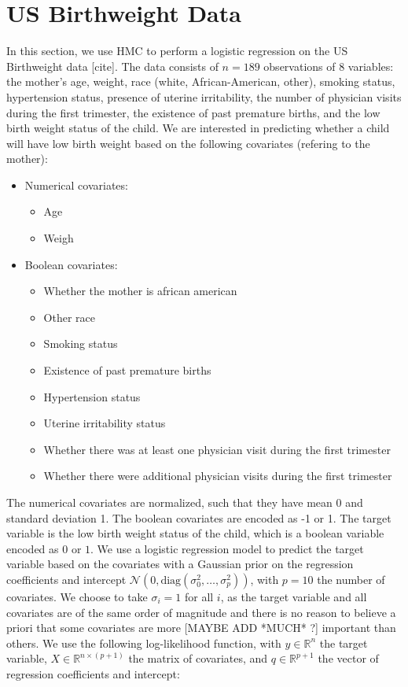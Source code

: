 \documentclass[a4paper, 12pt,oneside]{article}
\begin{document}
	\section{US Birthweight Data}
	In this section, we use HMC to perform a logistic regression on the US Birthweight data [cite]. The data consists of $n=189$ observations of 8 variables: the mother's age, weight, race (white, African-American, other), smoking status, hypertension status, presence of uterine irritability, the number of physician visits during the first trimester, the existence of past premature births, and the low birth weight status of the child. We are interested in predicting whether a child will have low birth weight based on the following covariates (refering to the mother):
	\begin{itemize}
		\item Numerical covariates:
		\begin{itemize}
			\item Age
			\item Weigh
		\end{itemize}
		\item Boolean covariates:
		\begin{itemize}
			\item Whether the mother is african american
			\item Other race
			\item Smoking status
			\item Existence of past premature births
			\item Hypertension status
			\item Uterine irritability status
			\item Whether there was at least one physician visit during the first trimester
			\item Whether there were additional physician visits during the first trimester
		\end{itemize}
	\end{itemize}
	The numerical covariates are normalized, such that they have mean 0 and standard deviation 1. The boolean covariates are encoded as -1 or 1. The target variable is the low birth weight status of the child, which is a boolean variable encoded as $0$ or $1$. We use a logistic regression model to predict the target variable based on the covariates with a Gaussian prior on the regression coefficients and intercept $\mathcal{N}(0,\mathrm{diag}(\sigma^2_0, \ldots, \sigma^2_p))$, with $p=10$ the number of covariates. We choose to take $\sigma_i = 1$ for all $i$, as the target variable and all covariates are of the same order of magnitude and there is no reason to believe a priori that some covariates are more [MAYBE ADD *MUCH* ?] important than others. We use the following log-likelihood function, with $y\in \mathbb{R}^{n}$ the target variable, $X\in \mathbb{R}^{n\times (p+1)}$ the matrix of covariates, and $q\in \mathbb{R}^{p+1}$ the vector of regression coefficients and intercept:
\end{document}
